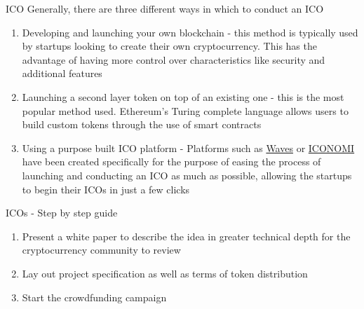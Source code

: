 \documentclass[11pt]{beamer}
\begin{document}

\begin{frame}{ICO}
	Generally, there are three different ways in which to conduct an ICO
	\begin{enumerate}
		\item Developing and launching your own blockchain - this method is typically used by startups looking to create their own cryptocurrency. This has the advantage of having more control over characteristics like security and additional features
		\item Launching a second layer token on top of an existing one - this is the most popular method used. Ethereum's Turing complete language allows users to build custom tokens through the use of smart contracts
		\item Using a purpose built ICO platform - Platforms such as \href{https://wavesplatform.com/product}{Waves} or \href{https://www.iconomi.net}{ICONOMI} have been created specifically for the purpose of easing the process of launching and conducting an ICO as much as possible, allowing the startups to begin their ICOs in just a few clicks
	\end{enumerate}
\end{frame}


\begin{frame}{ICOs - Step by step guide}
	\begin{enumerate}
		\item Present a white paper to describe the idea in greater technical depth for the cryptocurrency community to review
		\item Lay out project specification as well as terms of token distribution
		\item Start the crowdfunding campaign
	\end{enumerate}
\end{frame}


\end{document}
